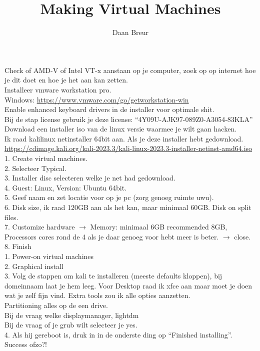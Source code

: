 \documentclass{article}
\author{Daan Breur}
\title{Making Virtual Machines}
\makeatletter
\newcommand{\problem}[2]{\noindent\llap{#1.\space}#2}
\def\makeheader{%
\par\noindent{\large\begin{tabular}{@{}l@{}}
\@author \\
\@idnumber \\
\@classname
\end{tabular}}\par\nobreak\vskip20pt
\noindent{\bfseries\LARGE\@title\par}\bigskip
}
\makeatother
\begin{document}
\makeheader
\problem{Pre-requirements}
Check of AMD-V of Intel VT-x aanstaan op je computer, zoek op op internet hoe je dit doet en hoe je het aan kan zetten.\\

\problem{A}
Installeer vmware workstation pro. \\
Windows: \url{https://www.vmware.com/go/getworkstation-win} \\
Enable enhanced keyboard drivers in de installer voor optimale shit. \\
Bij de stap license gebruik je deze license: ``4Y09U-AJK97-089Z0-A3054-83KLA''\\

\problem{B}
Download een installer iso van de linux versie waarmee je wilt gaan hacken.\\
Ik raad kalilinux netinstaller 64bit aan. Als je deze installer hebt gedownload.\\
\url{https://cdimage.kali.org/kali-2023.3/kali-linux-2023.3-installer-netinst-amd64.iso}\\

\problem{C}
1. Create virtual machines.\\
2. Selecteer Typical.\\
3. Installer disc selecteren welke je net had gedownload.\\
4. Guest: Linux, Version: Ubuntu 64bit.\\
5. Geef naam en zet locatie voor op je pc (zorg genoeg ruimte uwu).\\
6. Disk size, ik raad 120GB aan als het kan, maar minimaal 60GB. Disk on split files.\\
7. Customize hardware $\rightarrow$ Memory: minimaal 6GB recommended 8GB, Processors cores rond de 4 als je daar genoeg voor hebt meer is beter. $\rightarrow$ close.
8. Finish\\

\newpage
\problem{D}
1. Power-on virtual machines\\
2. Graphical install\\
3. Volg de stappen om kali te installeren (meeste defaults kloppen), bij domeinnaam laat je hem leeg. Voor Desktop raad ik xfce aan maar moet je doen wat je zelf fijn vind. Extra tools zou ik alle opties aanzetten.\\
Partitioning alles op de een drive.\\
Bij de vraag welke displaymanager, lightdm\\
Bij de vraag of je grub wilt selecteer je yes.\\
4. Als hij gereboot is, druk in in de onderste ding op ``Finished installing''.\\

\problem{E}
Success ofzo?!\\
\end{document}
